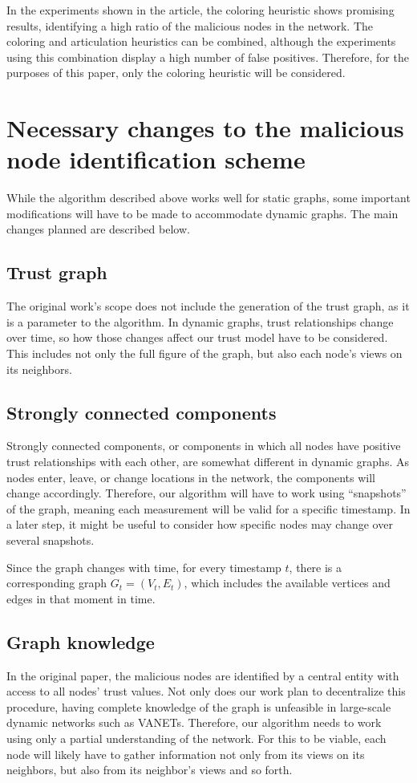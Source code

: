 In the experiments shown in the article, the coloring heuristic shows promising results, identifying a high ratio of the malicious nodes in the network.
The coloring and articulation heuristics can be combined, although the experiments using this combination display a high number of false positives.
Therefore, for the purposes of this paper, only the coloring heuristic will be considered.

\section{Necessary changes to the malicious node identification scheme}
\label{section:changes}
While the algorithm described above works well for static graphs, some important modifications will have to be made to accommodate dynamic graphs.
The main changes planned are described below.

\subsection{Trust graph}
The original work's scope does not include the generation of the trust graph, as it is a parameter to the algorithm.
In dynamic graphs, trust relationships change over time, so how those changes affect our trust model have to be considered.
This includes not only the full figure of the graph, but also each node's views on its neighbors.

\subsection{Strongly connected components}
Strongly connected components, or components in which all nodes have positive trust relationships with each other, are somewhat different in dynamic graphs.
As nodes enter, leave, or change locations in the network, the components will change accordingly.
Therefore, our algorithm will have to work using ``snapshots'' of the graph, meaning each measurement will be valid for a specific timestamp.
In a later step, it might be useful to consider how specific nodes may change over several snapshots.

Since the graph changes with time, for every timestamp $t$, there is a corresponding graph $G_t=(V_t, E_t)$, which includes the available vertices and edges in that moment in time.

\subsection{Graph knowledge}
In the original paper, the malicious nodes are identified by a central entity with access to all nodes' trust values.
Not only does our work plan to decentralize this procedure, having complete knowledge of the graph is unfeasible in large-scale dynamic networks such as VANETs.
Therefore, our algorithm needs to work using only a partial understanding of the network.
For this to be viable, each node will likely have to gather information not only from its views on its neighbors, but also from its neighbor's views and so forth.


